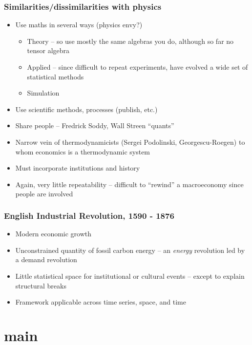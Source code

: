 \documentclass[final]{beamer}
\begin{document}
\begin{frame}
\frametitle{Similarities/dissimilarities with physics}
\begin{itemize}
\item Use maths in several ways (physics envy?)
	\begin{itemize}
	\item Theory -- so use mostly the same algebras you do, although so far no tensor algebra
	\item Applied -- since difficult to repeat experiments, have evolved a wide set of statistical methods
	\item Simulation
	\end{itemize}
\item Use scientific methods, processes (publish, etc.)
\item Share people -- Fredrick Soddy, Wall Streen ``quants''
\item Narrow vein of thermodynamicists (Sergei Podolinski, Georgescu-Roegen) to whom economics is a thermodynamic system
\item Must incorporate institutions and history
\item Again, very little repeatability -- difficult to ``rewind'' a macroeconomy since people are involved
\end{itemize}
\end{frame}

\begin{frame}
\frametitle{English Industrial Revolution, 1590 - 1876}

	\begin{itemize}
	\item Modern economic growth
	\item Unconstrained quantity of fossil carbon energy -- an \textit{energy} revolution led by a demand revolution
	\item Little statistical space for institutional or cultural events -- except to explain structural breaks
	\item Framework applicable across time series, space, and time
	\end{itemize}
\end{frame}

\section{main}
\end{document}
